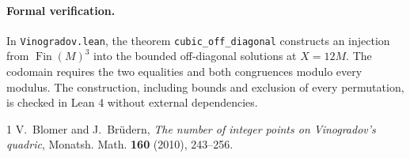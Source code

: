\documentclass[11pt]{article}
\begin{document}
\paragraph{Formal verification.}
In \texttt{Vinogradov.lean}, the theorem \texttt{cubic\_off\_diagonal}
constructs an injection from \(\operatorname{Fin}(M)^3\) into the bounded
off-diagonal solutions at \(X=12M\). The codomain requires the two
equalities and both congruences modulo every modulus. The construction,
including bounds and exclusion of every permutation, is checked in Lean 4
without external dependencies.

\begin{thebibliography}{1}
V.~Blomer and J.~Br\"udern, \emph{The number of integer points on
Vinogradov's quadric}, Monatsh. Math. \textbf{160} (2010), 243--256.
\end{thebibliography}
\end{document}
